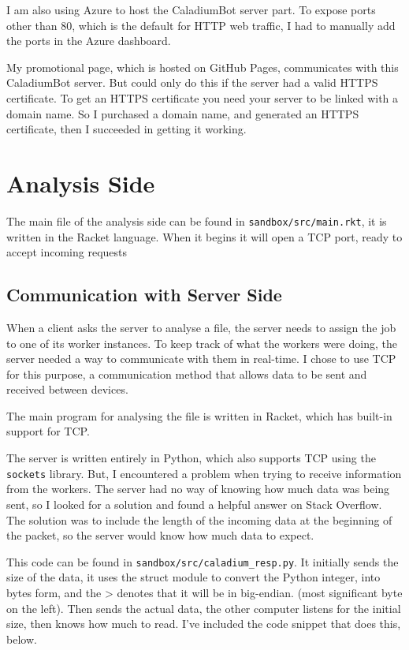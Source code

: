 I am also using Azure to host the CaladiumBot server part.
To expose ports other than 80,
which is the default for HTTP web traffic,
I had to manually add the ports in the Azure dashboard.

My promotional page, which is hosted on GitHub Pages,
communicates with this CaladiumBot server.
But could only do this if the server had a valid HTTPS certificate.
To get an HTTPS certificate you need your server to
be linked with a domain name.
So I purchased a domain name, and generated an HTTPS certificate,
then I succeeded in getting it working.

\section{Analysis Side}
The main file of the analysis side can be found in
\texttt{sandbox/src/main.rkt},
it is written in the Racket language.
When it begins it will open a TCP port,
ready to accept incoming requests

\subsection{Communication with Server Side}
When a client asks the server to analyse a file,
the server needs to assign the job to one of its worker instances.
To keep track of what the workers were doing,
the server needed a way to communicate with them in real-time.
I chose to use TCP for this purpose,
a communication method that allows data to be sent and received between devices.

The main program for analysing the file is written in Racket,
which has built-in support for TCP.

The server is written entirely in Python,
which also supports TCP using the \texttt{sockets} library.
But, I encountered a problem when trying to receive information from the workers.
The server had no way of knowing how much data was being sent,
so I looked for a solution and found a
helpful answer on Stack Overflow. \cite{chqrlie:2022}
The solution was to include the length of the incoming
data at the beginning of the packet,
so the server would know how much data to expect.

This code can be found in \texttt{sandbox/src/caladium\_resp.py}.
It initially sends the size of the data,
it uses the struct module to convert the Python integer,
into bytes form, and the > denotes that it will be in big-endian.
(most significant byte on the left).
Then sends the actual data,
the other computer listens for the initial size,
then knows how much to read.
I've included the code snippet that does this, below.

